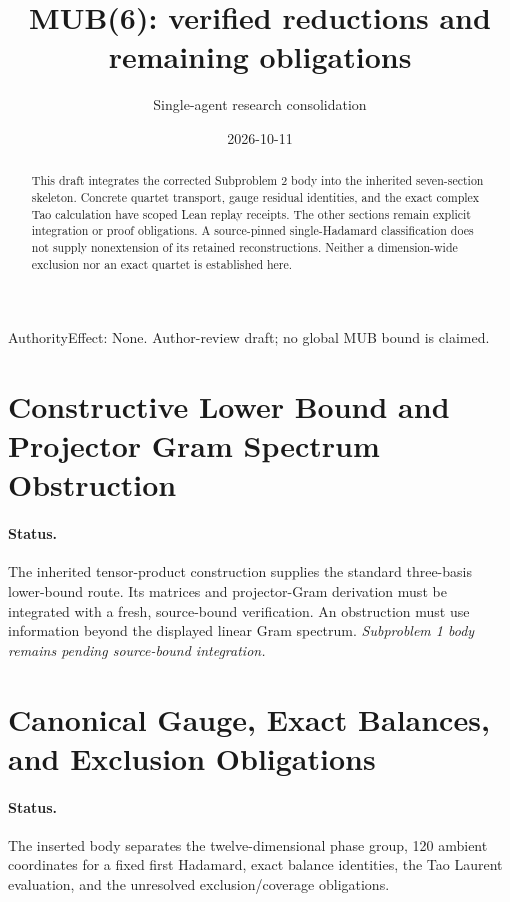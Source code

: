 \documentclass[11pt,a4paper]{article}
\title{MUB(6): verified reductions and remaining obligations}
\author{Single-agent research consolidation}
\date{2026-10-11}
\theoremstyle{plain}
\theoremstyle{definition}
\begin{document}
\maketitle
\noindent AuthorityEffect: None. Author-review draft; no global MUB bound is claimed.

\begin{abstract}
This draft integrates the corrected Subproblem 2 body into the inherited seven-section skeleton. Concrete quartet transport, gauge residual identities, and the exact complex Tao calculation have scoped Lean replay receipts. The other sections remain explicit integration or proof obligations. A source-pinned single-Hadamard classification does not supply nonextension of its retained reconstructions. Neither a dimension-wide exclusion nor an exact quartet is established here.
\end{abstract}

\section{Constructive Lower Bound and Projector Gram Spectrum Obstruction}
\paragraph{Status.} The inherited tensor-product construction supplies the standard three-basis lower-bound route. Its matrices and projector-Gram derivation must be integrated with a fresh, source-bound verification. An obstruction must use information beyond the displayed linear Gram spectrum.
\emph{Subproblem 1 body remains pending source-bound integration.}

\section{Canonical Gauge, Exact Balances, and Exclusion Obligations}
\paragraph{Status.} The inserted body separates the twelve-dimensional phase group, 120 ambient coordinates for a fixed first Hadamard, exact balance identities, the Tao Laurent evaluation, and the unresolved exclusion/coverage obligations.
\end{document}
